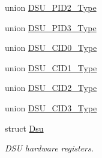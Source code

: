 \begin{DoxyCompactItemize}
union \mbox{\hyperlink{union_d_s_u___p_i_d2___type}{D\+S\+U\+\_\+\+P\+I\+D2\+\_\+\+Type}}
\item 
union \mbox{\hyperlink{union_d_s_u___p_i_d3___type}{D\+S\+U\+\_\+\+P\+I\+D3\+\_\+\+Type}}
\item 
union \mbox{\hyperlink{union_d_s_u___c_i_d0___type}{D\+S\+U\+\_\+\+C\+I\+D0\+\_\+\+Type}}
\item 
union \mbox{\hyperlink{union_d_s_u___c_i_d1___type}{D\+S\+U\+\_\+\+C\+I\+D1\+\_\+\+Type}}
\item 
union \mbox{\hyperlink{union_d_s_u___c_i_d2___type}{D\+S\+U\+\_\+\+C\+I\+D2\+\_\+\+Type}}
\item 
union \mbox{\hyperlink{union_d_s_u___c_i_d3___type}{D\+S\+U\+\_\+\+C\+I\+D3\+\_\+\+Type}}
\item 
struct \mbox{\hyperlink{struct_dsu}{Dsu}}
\begin{DoxyCompactList}\small\item\em D\+SU hardware registers. \end{DoxyCompactList}\end{DoxyCompactItemize}
